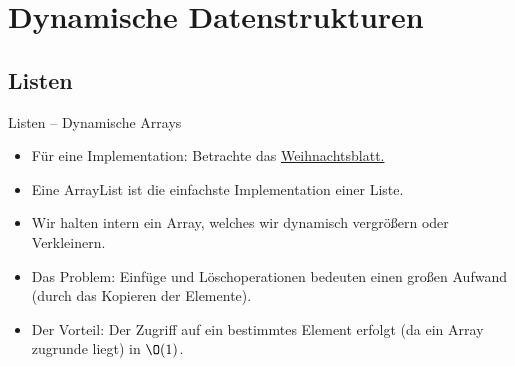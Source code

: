 \section{Dynamische Datenstrukturen}
\subsection{Listen}
\begin{frame}{Listen -- Dynamische Arrays}
    \begin{itemize}[<+(1)->]
        \widei
        \item Für eine Implementation: Betrachte das \href{https://github.com/EagleoutIce/eidi-weihnachttsblatt-19_20}{Weihnachtsblatt.\textsuperscript{\faGlobe}}
        \item Eine ArrayList ist die einfachste Implementation einer Liste.
        \item Wir halten intern ein Array, welches wir dynamisch vergrößern oder Verkleinern.
        \item Das Problem: Einfüge und Löschoperationen bedeuten einen großen Aufwand (durch das Kopieren der Elemente).
        \item Der Vorteil: Der Zugriff auf ein bestimmtes Element erfolgt (da ein Array zugrunde liegt) in \(\O(1)\).
    \end{itemize}
\end{frame}

\def\Element#1{{\renewcommand{\arraystretch}{1.4}%
    \begin{tabular}{|>{\centering}p{1em}|p{1em}|}
        \hline\strut#1 & \\\hline
    \end{tabular}%
}}

\def\EndElement{{\renewcommand{\arraystretch}{1.5}%
    \begin{tabular}{|>{\centering\arraybackslash}p{1em}|}
        \hline\strut/\\\hline
    \end{tabular}
}}

